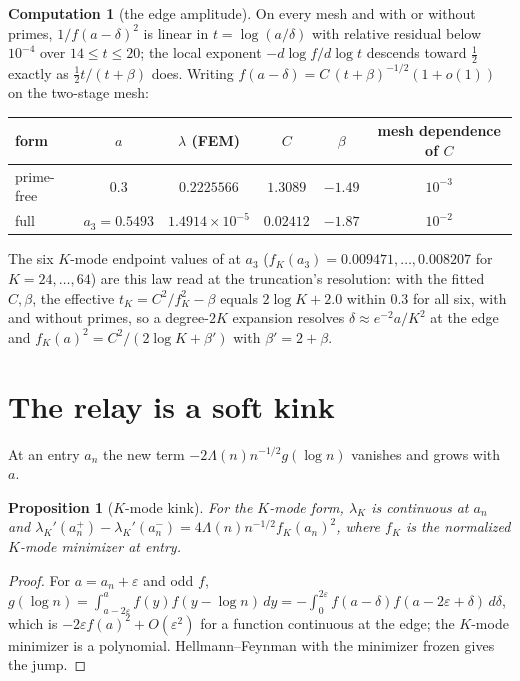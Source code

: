 \documentclass[11pt]{article}
\newtheorem{proposition}[theorem]{Proposition}
\theoremstyle{definition}
\newtheorem{computation}[theorem]{Computation}
\theoremstyle{remark}
\begin{document}
\begin{computation}[the edge amplitude]\label{comp:edge}
On every mesh and with or without primes, $1/f(a-\delta)^2$ is linear in $t=\log(a/\delta)$ with relative residual below $10^{-4}$ over $14\le t\le20$; the local exponent $-d\log f/d\log t$ descends toward $\tfrac12$ exactly as $\tfrac12 t/(t+\beta)$ does. Writing $f(a-\delta)=C\,(t+\beta)^{-1/2}(1+o(1))$ on the two-stage mesh:
\begin{center}
\begin{tabular}{@{}lccccc@{}}
\toprule
form & $a$ & $\lambda$ (FEM) & $C$ & $\beta$ & mesh dependence of $C$\\
\midrule
prime-free & $0.3$ & $0.2225566$ & $1.3089$ & $-1.49$ & $10^{-3}$\\
full & $a_3=0.5493$ & $1.4914\times10^{-5}$ & $0.02412$ & $-1.87$ & $10^{-2}$\\
\bottomrule
\end{tabular}
\end{center}
The six $K$-mode endpoint values of \cite{michaels-folds} at $a_3$ ($f_K(a_3)=0.009471,\dots,0.008207$ for $K=24,\dots,64$) are this law read at the truncation's resolution: with the fitted $C,\beta$, the effective $t_K=C^2/f_K^2-\beta$ equals $2\log K+2.0$ within $0.3$ for all six, with and without primes, so a degree-$2K$ expansion resolves $\delta\approx e^{-2}a/K^2$ at the edge and $f_K(a)^2=C^2/(2\log K+\beta')$ with $\beta'=2+\beta$.
\end{computation}

\section{The relay is a soft kink}\label{sec:kink}

At an entry $a_n$ the new term $-2\Lambda(n)n^{-1/2}g(\log n)$ vanishes and grows with $a$.

\begin{proposition}[$K$-mode kink]\label{prop:kink}
For the $K$-mode form, $\lambda_K$ is continuous at $a_n$ and $\lambda_K'(a_n^+)-\lambda_K'(a_n^-)=4\Lambda(n)n^{-1/2}f_K(a_n)^2$, where $f_K$ is the normalized $K$-mode minimizer at entry.
\end{proposition}
\begin{proof}
For $a=a_n+\varepsilon$ and odd $f$, $g(\log n)=\int_{a-2\varepsilon}^{a}f(y)f(y-\log n)\,dy=-\int_0^{2\varepsilon}f(a-\delta)f(a-2\varepsilon+\delta)\,d\delta$, which is $-2\varepsilon f(a)^2+O(\varepsilon^2)$ for a function continuous at the edge; the $K$-mode minimizer is a polynomial. Hellmann--Feynman with the minimizer frozen gives the jump.
\end{proof}
\end{document}
